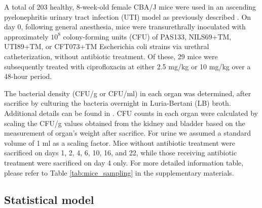 \documentclass{article}
\begin{document}
A total of 203 healthy, 8-week-old female CBA/J mice were used in an ascending pyelonephritis urinary tract infection (UTI) model as previously described \cite{labat2005mutator}. On day 0, following general anesthesia, mice were transurethrally inoculated with approximately $10^8$ colony-forming units (CFU) of PAS133, NILS69+TM, UTI89+TM, or CFT073+TM Escherichia coli strains via urethral catheterization, without antibiotic treatment. Of these, 29 mice were subsequently treated with ciprofloxacin at either 2.5 mg/kg or 10 mg/kg over a 48-hour period.


The bacterial density (CFU/g or CFU/ml) in each organ was determined, after sacrifice by culturing the bacteria overnight in Luria-Bertani (LB) broth. Additional details can be found in \cite{amoura2024variability}.
CFU counts in each organ were calculated by scaling the CFU/g values obtained from the kidney and bladder based on the measurement of organ's weight after sacrifice. For urine we assumed a standard volume of 1 ml as a scaling factor. Mice without antibiotic treatment were sacrificed on days 1, 2, 4, 6, 10, 16, and 22, while those receiving antibiotic treatment were sacrificed on day 4 only. For more detailed information table, please refer  to Table \ref{tab:mice_sampling} in the supplementary materials.










\subsection{Statistical model}
\end{document}
